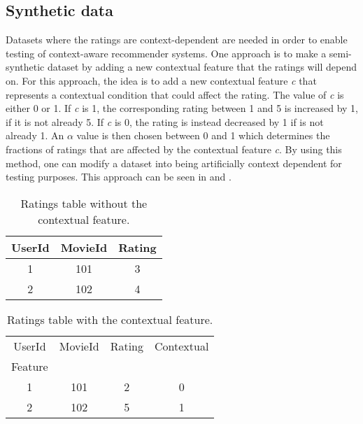\subsection{Synthetic data}
Datasets where the ratings are context-dependent are needed in order to enable testing of context-aware recommender systems.
One approach is to make a semi-synthetic dataset by adding a new contextual feature that the ratings will depend on\cite{baltrunasContextItemSplit}.
For this approach, the idea is to add a new contextual feature \textit{c} that represents a contextual condition that could affect the rating.
The value of \textit{c} is either 0 or 1. 
If \textit{c} is 1, the corresponding rating between 1 and 5 is increased by 1, if it is not already 5.
If \textit{c} is 0, the rating is instead decreased by 1 if is not already 1.
An $\alpha$ value is then chosen between 0 and 1 which determines the fractions of ratings that are affected by the contextual feature \textit{c}.
By using this method, one can modify a dataset into being artificially context dependent for testing purposes.
This approach can be seen in  and .
\begin{table*}[hbt!]
    \centering
    \begin{tabular}{|c|c|c|}
    \hline
    UserId & MovieId & Rating \\ [0.5ex] 
    \hline\hline
    1 & 101 & 3 \\
    \hline
    2 & 102 & 4 \\
    \hline
    \end{tabular}
    \caption{Ratings table without the contextual feature.}
    \label{tab:synthetic-data1}
\end{table*}
\begin{table*}[hbt!]
    \centering
    \begin{tabular}{|c|c|c|c|} 
    \hline
    UserId & MovieId & Rating & Contextual\\Feature \\ [0.5ex] 
    \hline\hline
    1 & 101 & 2 & 0 \\
    \hline
    2 & 102 & 5 & 1 \\
    \hline
    \end{tabular}
    \caption{Ratings table with the contextual feature.}
    \label{tab:synthetic-data2}
\end{table*}
